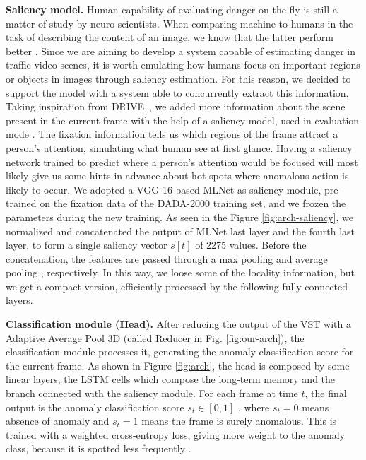 \noindent\textbf{Saliency model.}
Human capability of evaluating danger on the fly is still a matter of study by neuro-scientists.
When comparing machine to humans in the task of describing the content of an image, we know that the latter perform better \cite{jiang2015salicon}.
Since we are aiming to develop a system capable of estimating danger in traffic video scenes, it is worth emulating how humans focus on important regions or objects in images through saliency estimation.
For this reason, we decided to support the model with a system able to concurrently extract this information.
Taking inspiration from DRIVE~\cite{bao2021drive}, we added more information about the scene present in the current frame with the help of a saliency model, used in evaluation mode .
The fixation information tells us which regions of the frame attract a person's attention, simulating what human see at first glance.
Having a saliency network trained to predict where a person's attention would be focused will most likely give us some hints in advance about hot spots where anomalous action is likely to occur. 
We adopted a VGG-16-based MLNet \cite{cornia2016deep} as saliency module, pre-trained on the fixation data of the DADA-2000 \cite{fang2019dada} training set, and we frozen the parameters during the new training.
As seen in the Figure \ref{fig:arch-saliency}, we normalized and concatenated the output of MLNet last layer and the fourth last layer, to form a single saliency vector $s[t]$ of 2275 values.
Before the concatenation, the features are passed through a max pooling and average pooling , respectively.
In this way, we loose some of the locality information, but we get a compact version, efficiently processed by the following fully-connected layers.

\noindent\textbf{Classification module (Head).}
After reducing the output of the VST with a Adaptive Average Pool 3D (called Reducer in Fig. \ref{fig:our-arch}), the classification module processes it, generating the anomaly classification score for the current frame.
As shown in Figure \ref{fig:arch}, the head is composed by some linear layers, the LSTM cells which compose the long-term memory and the branch connected with the saliency module.
For each frame at time $t$, the final output is the anomaly classification score $s_t \in [0,1]$ , where $s_t=0$ means absence of anomaly and $s_t=1$ means the frame is surely anomalous.
This is trained with a weighted cross-entropy loss, giving more weight to the anomaly class, because it is spotted less frequently  .


